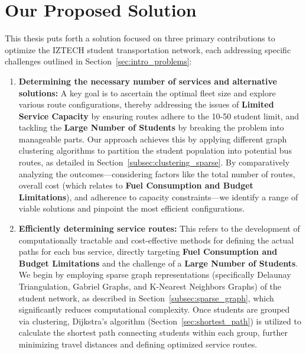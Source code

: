 \section{Our Proposed Solution}
\label{sec:intro_solution}
This thesis puts forth a solution focused on three primary contributions to optimize the IZTECH student transportation network, each addressing specific challenges outlined in Section~\ref{sec:intro_problems}:

\begin{enumerate}
    \item \textbf{Determining the necessary number of services and alternative solutions:} A key goal is to ascertain the optimal fleet size and explore various route configurations, thereby addressing the issues of \textbf{Limited Service Capacity} by ensuring routes adhere to the 10-50 student limit, and tackling the \textbf{Large Number of Students} by breaking the problem into manageable parts. Our approach achieves this by applying different graph clustering algorithms to partition the student population into potential bus routes, as detailed in Section~\ref{subsec:clustering_sparse}. By comparatively analyzing the outcomes—considering factors like the total number of routes, overall cost (which relates to \textbf{Fuel Consumption and Budget Limitations}), and adherence to capacity constraints—we identify a range of viable solutions and pinpoint the most efficient configurations.
    
    \item \textbf{Efficiently determining service routes:} This refers to the development of computationally tractable and cost-effective methods for defining the actual paths for each bus service, directly targeting \textbf{Fuel Consumption and Budget Limitations} and the challenge of a \textbf{Large Number of Students}. We begin by employing sparse graph representations (specifically Delaunay Triangulation, Gabriel Graphs, and K-Nearest Neighbors Graphs) of the student network, as described in Section~\ref{subsec:sparse_graph}, which significantly reduces computational complexity. Once students are grouped via clustering, Dijkstra's algorithm (Section~\ref{sec:shortest_path}) is utilized to calculate the shortest path connecting students within each group, further minimizing travel distances and defining optimized service routes.
    

\end{enumerate}
